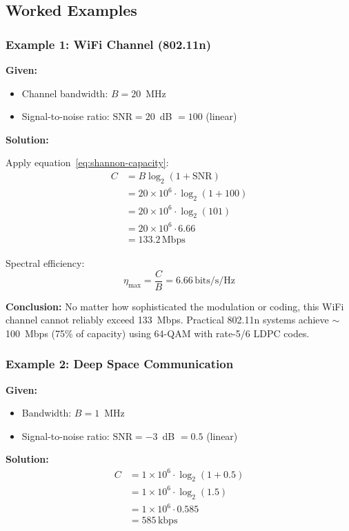 \subsection{Worked Examples}

\subsubsection{Example 1: WiFi Channel (802.11n)}

\textbf{Given:}
\begin{itemize}
\item Channel bandwidth: $B = 20$~MHz
\item Signal-to-noise ratio: $\mathrm{SNR} = 20$~dB $= 100$ (linear)
\end{itemize}

\textbf{Solution:}

Apply equation~\eqref{eq:shannon-capacity}:
\begin{align}
C &= B \log_2(1 + \mathrm{SNR}) \nonumber \\
  &= 20 \times 10^6 \cdot \log_2(1 + 100) \nonumber \\
  &= 20 \times 10^6 \cdot \log_2(101) \nonumber \\
  &= 20 \times 10^6 \cdot 6.66 \nonumber \\
  &= 133.2\,\text{Mbps}
\end{align}

Spectral efficiency:
\begin{equation}
\eta_{\max} = \frac{C}{B} = 6.66\,\text{bits/s/Hz}
\end{equation}

\textbf{Conclusion:} No matter how sophisticated the modulation or coding, this WiFi channel cannot reliably exceed 133~Mbps. Practical 802.11n systems achieve $\sim$100~Mbps (75\% of capacity) using 64-QAM with rate-5/6 LDPC codes.

\subsubsection{Example 2: Deep Space Communication}

\textbf{Given:}
\begin{itemize}
\item Bandwidth: $B = 1$~MHz
\item Signal-to-noise ratio: $\mathrm{SNR} = -3$~dB $= 0.5$ (linear)
\end{itemize}

\textbf{Solution:}
\begin{align}
C &= 1 \times 10^6 \cdot \log_2(1 + 0.5) \nonumber \\
  &= 1 \times 10^6 \cdot \log_2(1.5) \nonumber \\
  &= 1 \times 10^6 \cdot 0.585 \nonumber \\
  &= 585\,\text{kbps}
\end{align}

